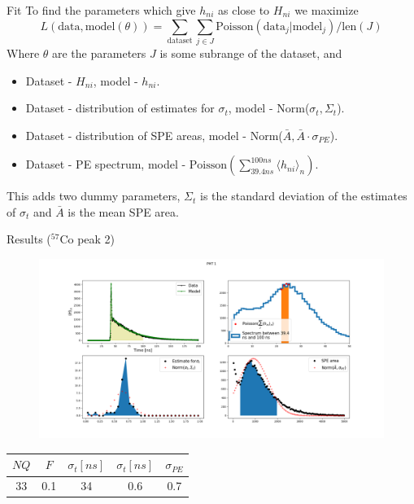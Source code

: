 \documentclass{beamer}
\begin{document}
\begin{frame}{Fit}
To find the parameters which give $h_{ni}$ as close to $H_{ni}$ we maximize 
\begin{equation}
L(\text{data},\text{model}(\theta))=\sum_{\text{dataset}}\sum_{j\in J}\text{Poisson}(\text{data}_j|\text{model}_j)/\text{len}(J)
\end{equation}
Where $\theta$ are the parameters $J$ is some subrange of the dataset, and
\begin{itemize}
\item Dataset - $H_{ni}$, model - $h_{ni}$.
\item Dataset - distribution of estimates for $\sigma_t$, model - Norm($\sigma_t, \Sigma_t$).
\item Dataset - distribution of SPE areas, model - Norm($\bar{A}, \bar{A}\cdot\sigma_{PE}$).
\item Dataset - PE spectrum, model - $\text{Poisson}(\sum_{39.4 ns}^{100 ns}\langle h_{ni}\rangle_n)$.
\end{itemize}
This adds two dummy parameters, $\Sigma_t$ is the standard deviation of the estimates of $\sigma_t$ and $\bar{A}$ is the mean SPE area. 
\end{frame}

\begin{frame}{Results ($^{57}$Co peak 2)}
\begin{figure}[h]
\includegraphics[width=1\linewidth]{Co2.png}
\end{figure}

\begin{center}
\begin{tabular}{ |c| c| c| c| c|}
\hline
 $NQ$ & $F$ & $\sigma_t [ns]$ & $\sigma_t [ns]$ & $\sigma_{PE}$\\ 
\hline
33 & 0.1 & 34 & 0.6 & 0.7\\  
\hline   
\end{tabular}
\end{center}
\end{frame}
\end{document}
